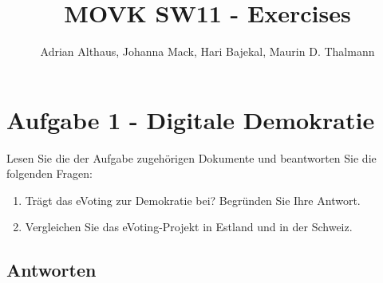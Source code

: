 \documentclass[a4paper]{article}
\title{MOVK SW11 - Exercises}
\author{Adrian Althaus, Johanna Mack, Hari Bajekal, Maurin D. Thalmann}
\begin{document}
	
\maketitle

\section*{Aufgabe 1 - Digitale Demokratie}

	Lesen Sie die der Aufgabe zugehörigen Dokumente und beantworten Sie die folgenden Fragen:
	
	\begin{enumerate}
		\item Trägt das eVoting zur Demokratie bei? Begründen Sie Ihre Antwort.
		\item Vergleichen Sie das eVoting-Projekt in Estland und in der Schweiz.
	\end{enumerate}
	
\subsection*{Antworten}
\end{document}
